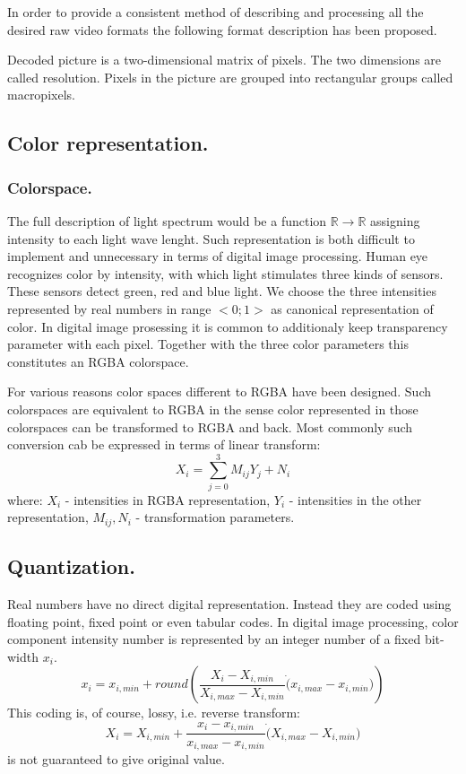 In order to provide a consistent method of describing and processing all the desired raw video formats the following format description has been proposed.

Decoded picture is a two-dimensional matrix of pixels. The two dimensions are called resolution. Pixels in the picture are grouped into rectangular groups called macropixels.

\subsection{Color representation.}

\subsubsection{Colorspace.}

The full description of light spectrum would be a function $\mathbb{R} \to \mathbb{R}$ assigning intensity to each light wave lenght. Such representation is both difficult to implement and unnecessary in terms of digital image processing. Human eye recognizes color by intensity, with which light stimulates three kinds of sensors. These sensors detect green, red and blue light. We choose the three intensities represented by real numbers in range $<0; 1>$ as canonical representation of color. In digital image prosessing it is common to additionaly keep transparency parameter with each pixel. Together with the three color parameters this constitutes an RGBA colorspace.

For various reasons color spaces different to RGBA have been designed. Such colorspaces are equivalent to RGBA in the sense color represented in those colorspaces can be transformed to RGBA and back. Most commonly such conversion cab be expressed in terms of linear transform:
\begin{equation}
X_i = \sum^3_{j=0} M_{ij} Y_j + N_i
\end{equation}
where: $X_i$ - intensities in RGBA representation, $Y_i$ - intensities in the other representation, $M_{ij}, N_{i}$ - transformation parameters.

\subsection{Quantization.}

Real numbers have no direct digital representation. Instead they are coded using floating point, fixed point or even tabular codes. In digital image processing, color component intensity number is represented by an integer number of a fixed bit-width $x_i$.
\begin{equation}
x_i = x_{i,min} + round \left( \frac{X_i - X_{i,min}}{X_{i,max} - X_{i,min}} \dot (x_{i,max} - x_{i,min}) \right)
\end{equation}
This coding is, of course, lossy, i.e. reverse transform:
\begin{equation}
X_i = X_{i,min} + \frac{x_i - x_{i,min}}{x_{i,max} - x_{i,min}} \dot (X_{i,max} - X_{i,min})
\end{equation}
is not guaranteed to give original value.

